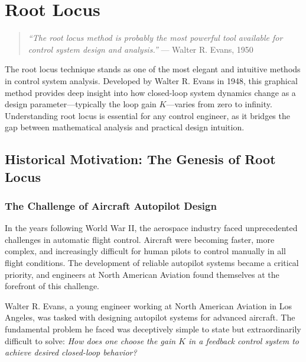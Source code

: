 
\chapter{Root Locus}
\label{ch:root_locus}

\begin{quote}
\textit{``The root locus method is probably the most powerful tool available for control system design and analysis.''} --- Walter R. Evans, 1950
\end{quote}

\vspace{1em}

The root locus technique stands as one of the most elegant and intuitive methods in control system analysis. Developed by Walter R. Evans in 1948, this graphical method provides deep insight into how closed-loop system dynamics change as a design parameter---typically the loop gain $K$---varies from zero to infinity. Understanding root locus is essential for any control engineer, as it bridges the gap between mathematical analysis and practical design intuition.

\section{Historical Motivation: The Genesis of Root Locus}
\label{sec:history}

\subsection{The Challenge of Aircraft Autopilot Design}

In the years following World War II, the aerospace industry faced unprecedented challenges in automatic flight control. Aircraft were becoming faster, more complex, and increasingly difficult for human pilots to control manually in all flight conditions. The development of reliable autopilot systems became a critical priority, and engineers at North American Aviation found themselves at the forefront of this challenge.

Walter R. Evans, a young engineer working at North American Aviation in Los Angeles, was tasked with designing autopilot systems for advanced aircraft. The fundamental problem he faced was deceptively simple to state but extraordinarily difficult to solve: \textit{How does one choose the gain $K$ in a feedback control system to achieve desired closed-loop behavior?}

